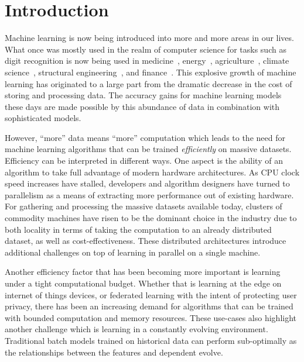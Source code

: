 \chapter{Introduction}

Machine learning is now being introduced into more and more areas in
our lives. What once was mostly used in the realm of computer science for
tasks such as digit recognition \cite{mnist} is now being used
in medicine~\cite{health-ml-1, health-ml-2}, energy~\cite{ml-building, ml-energy},
agriculture~\cite{ml-agriculture, ml-agriculture-2},
climate science~\cite{ml-climate-science}, structural engineering~\cite{ml-engineering},
and finance~\cite{ml-finance}. This explosive growth of machine learning has originated
to a large part from the dramatic decrease in the cost of storing and processing
data. The accuracy gains for machine learning models these
days are made possible by this abundance of data in combination with sophisticated
models.

However, ``more'' data means ``more'' computation which leads to the need for
machine learning algorithms that can be trained \emph{efficiently} on massive
datasets. Efficiency can be interpreted in different ways. One
aspect is the ability of an algorithm to take full advantage of modern
hardware architectures. As CPU clock speed increases have stalled, developers
and algorithm designers have turned to parallelism as a means of
extracting more performance out of existing hardware.
For gathering and processing the massive datasets available today,
clusters of commodity machines have risen to
be the dominant choice in the industry due to both locality
in terms of taking the computation to an already distributed
dataset, as well as cost-effectiveness. These distributed
architectures introduce additional challenges on top of
learning in parallel on a single machine.

Another efficiency factor that has been becoming more important
is learning under a tight computational budget. Whether that is
learning at the edge on internet of things devices, or
federated learning with the intent of protecting user privacy, there has
been an increasing demand for algorithms that can be trained
with bounded computation and memory resources.
These use-cases also highlight another challenge which is learning
in a constantly evolving environment. Traditional batch
models trained on historical data can perform sub-optimally as the
relationships between the features and dependent evolve.

